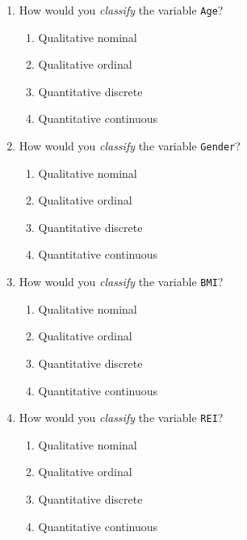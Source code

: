 \documentclass[
  11pt,
  a4paper,
  krantz2]{krantz}
\providecommand{\tightlist}{%
  \setlength{\itemsep}{0pt}\setlength{\parskip}{0pt}}
\begin{document}
\begin{enumerate}
\def\labelenumi{\arabic{enumi}.}
\tightlist
\item
  How would you \emph{classify} the variable \texttt{Age}? \tightlist

  \begin{enumerate}
  \def\labelenumii{\alph{enumii}.}
  \tightlist
  \item
    Qualitative nominal
  \item
    Qualitative ordinal
  \item
    Quantitative discrete
  \item
    Quantitative continuous
  \end{enumerate}
\item
  How would you \emph{classify} the variable \texttt{Gender}? \tightlist

  \begin{enumerate}
  \def\labelenumii{\alph{enumii}.}
  \tightlist
  \item
    Qualitative nominal
  \item
    Qualitative ordinal
  \item
    Quantitative discrete
  \item
    Quantitative continuous
  \end{enumerate}
\item
  How would you \emph{classify} the variable \texttt{BMI}? \tightlist

  \begin{enumerate}
  \def\labelenumii{\alph{enumii}.}
  \tightlist
  \item
    Qualitative nominal
  \item
    Qualitative ordinal
  \item
    Quantitative discrete
  \item
    Quantitative continuous
  \end{enumerate}
\item
  How would you \emph{classify} the variable \texttt{REI}? \tightlist

  \begin{enumerate}
  \def\labelenumii{\alph{enumii}.}
  \tightlist
  \item
    Qualitative nominal
  \item
    Qualitative ordinal
  \item
    Quantitative discrete
  \item
    Quantitative continuous
  \end{enumerate}
\end{enumerate}
\end{document}
